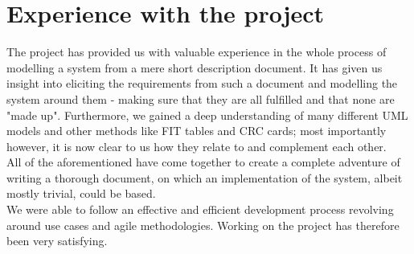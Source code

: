 \section{Experience with the project}
The project has provided us with valuable experience in the whole process of modelling a system from a mere short description document. It has given us insight into eliciting the requirements from such a document and modelling the system around them - making sure that they are all fulfilled and that none are "made up". Furthermore, we gained a deep understanding of many different UML models and other methods like FIT tables and CRC cards; most importantly however, it is now clear to us how they relate to and complement each other. \\
All of the aforementioned have come together to create a complete adventure of writing a thorough document, on which an implementation of the system, albeit mostly trivial, could be based. \\
We were able to follow an effective and efficient development process revolving around use cases and agile methodologies. Working on the project has therefore been very satisfying.